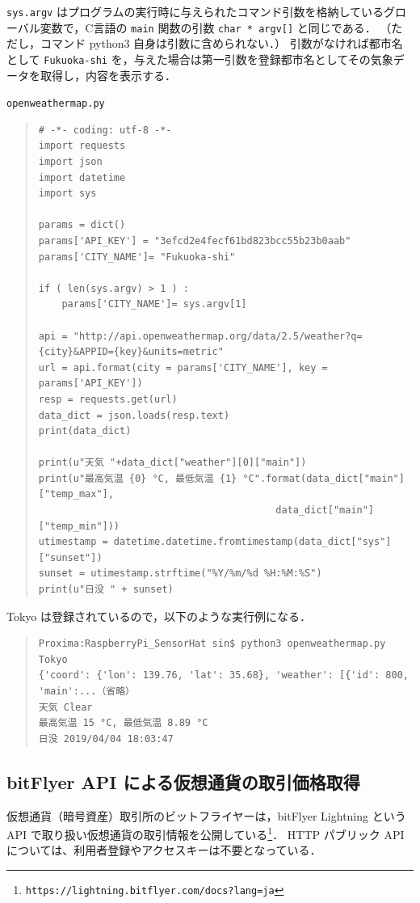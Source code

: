 \documentclass[11pt,a4,epsf]{article}
\begin{document}
\verb+sys.argv+ はプログラムの実行時に与えられたコマンド引数を格納しているグローバル変数で，C言語の \verb+main+ 関数の引数 \verb+char * argv[]+ と同じである．
（ただし，コマンド python3 自身は引数に含められない．）
引数がなければ都市名として \verb+Fukuoka-shi+ を，与えた場合は第一引数を登録都市名としてその気象データを取得し，内容を表示する．

\begin{itembox}[l]{\tt openweathermap.py}
\begin{quote}
\small
\begin{verbatim}
# -*- coding: utf-8 -*-
import requests
import json
import datetime
import sys

params = dict()
params['API_KEY'] = "3efcd2e4fecf61bd823bcc55b23b0aab"
params['CITY_NAME']= "Fukuoka-shi"

if ( len(sys.argv) > 1 ) :
    params['CITY_NAME']= sys.argv[1]

api = "http://api.openweathermap.org/data/2.5/weather?q={city}&APPID={key}&units=metric"
url = api.format(city = params['CITY_NAME'], key = params['API_KEY'])
resp = requests.get(url)
data_dict = json.loads(resp.text)
print(data_dict)

print(u"天気 "+data_dict["weather"][0]["main"])
print(u"最高気温 {0} °C, 最低気温 {1} °C".format(data_dict["main"]["temp_max"], 
                                         data_dict["main"]["temp_min"]))
utimestamp = datetime.datetime.fromtimestamp(data_dict["sys"]["sunset"])
sunset = utimestamp.strftime("%Y/%m/%d %H:%M:%S")
print(u"日没 " + sunset)
\end{verbatim}
\end{quote}
\end{itembox}

Tokyo は登録されているので，以下のような実行例になる．
\begin{quote}
\small
\begin{verbatim}
Proxima:RaspberryPi_SensorHat sin$ python3 openweathermap.py Tokyo
{'coord': {'lon': 139.76, 'lat': 35.68}, 'weather': [{'id': 800, 'main':...（省略）
天気 Clear
最高気温 15 °C, 最低気温 8.89 °C
日没 2019/04/04 18:03:47
\end{verbatim}
\end{quote}

\subsection{bitFlyer API による仮想通貨の取引価格取得}

仮想通貨（暗号資産）取引所のビットフライヤーは，bitFlyer Lightning という API で取り扱い仮想通貨の取引情報を公開している\footnote{{\tt https://lightning.bitflyer.com/docs?lang=ja} }．
HTTP パブリック API については、利用者登録やアクセスキーは不要となっている．
\end{document}
